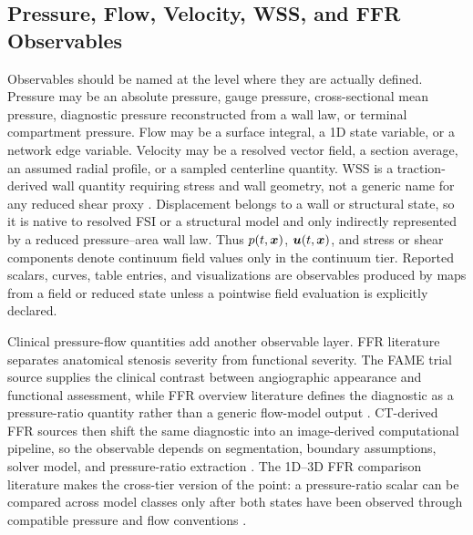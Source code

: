 \subsection{Pressure, Flow, Velocity, WSS, and FFR Observables}
\label{subsec:hemodynamic-observables}

Observables should be named at the level where they are actually defined.
Pressure may be an absolute pressure, gauge pressure, cross-sectional mean
pressure, diagnostic pressure reconstructed from a wall law, or terminal
compartment pressure. Flow may be a surface integral, a 1D state variable, or a
network edge variable. Velocity may be a resolved vector field, a section
average, an assumed radial profile, or a sampled centerline quantity. WSS is a
traction-derived wall quantity requiring stress and wall geometry, not a
generic name for any reduced shear proxy
\cite{JohnEtAl2017WallShearStressVectorForm}. Displacement belongs to a wall
or structural state, so it is native to resolved FSI or a structural model and
only indirectly represented by a reduced pressure--area wall law.
Thus $p(t,\bm{x})$, $\bm{u}(t,\bm{x})$, and stress or shear components denote continuum
field values only in the continuum tier. Reported scalars, curves, table
entries, and visualizations are observables produced by maps from a field or
reduced state unless a pointwise field evaluation is explicitly declared.

Clinical pressure-flow quantities add another observable layer. FFR literature
separates anatomical stenosis severity from functional severity. The FAME trial
source supplies the clinical contrast between angiographic appearance and
functional assessment, while FFR overview literature defines the diagnostic as
a pressure-ratio quantity rather than a generic flow-model output
\cite{ToninoEtAl2010FAMEAngioFunctional,TebaldiEtAl2015FFROverview}.
CT-derived FFR sources then shift the same diagnostic into an image-derived
computational pipeline, so the observable depends on segmentation, boundary
assumptions, solver model, and pressure-ratio extraction
\cite{NorgaardEtAl2014NXTFFRCT,ShaikhEtAl2025CTFFR}. The 1D--3D FFR comparison
literature makes the cross-tier version of the point: a pressure-ratio scalar
can be compared across model classes only after both states have been observed
through compatible pressure and flow conventions \cite{Blanco2018FFR1D3D}.

